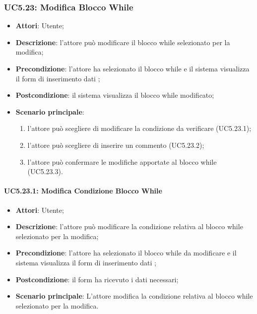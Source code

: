 \subsubsection{UC5.23: Modifica Blocco While}
\label{UC5.23}
\begin{itemize}
	\item \textbf{Attori}: Utente;
	\item \textbf{Descrizione}: l'attore può modificare il blocco while selezionato per la modifica;
	\item \textbf{Precondizione}: l'attore ha selezionato il blocco while e il sistema visualizza il form di inserimento dati ;
	\item \textbf{Postcondizione}: il sistema visualizza il blocco while modificato;
	\item \textbf{Scenario principale}:
	\begin{enumerate}
		\item l'attore può scegliere di modificare la condizione da verificare (UC5.23.1);
		\item l'attore può scegliere di inserire un commento (UC5.23.2);
		\item l'attore può confermare le modifiche apportate al blocco while (UC5.23.3).
	\end{enumerate}
\end{itemize}

\paragraph{UC5.23.1: Modifica Condizione Blocco While}
\label{UC5.23.1}
\begin{itemize}
	\item \textbf{Attori}: Utente;
	\item \textbf{Descrizione}: l'attore può modificare la condizione relativa al blocco while selezionato per la modifica;
	\item \textbf{Precondizione}: l'attore ha selezionato il blocco while da modificare e il sistema visualizza il form di inserimento dati ;
	\item \textbf{Postcondizione}: il form ha ricevuto i dati necessari;
	\item \textbf{Scenario principale}: L'attore modifica la condizione relativa al blocco while selezionato per la modifica.
\end{itemize}

